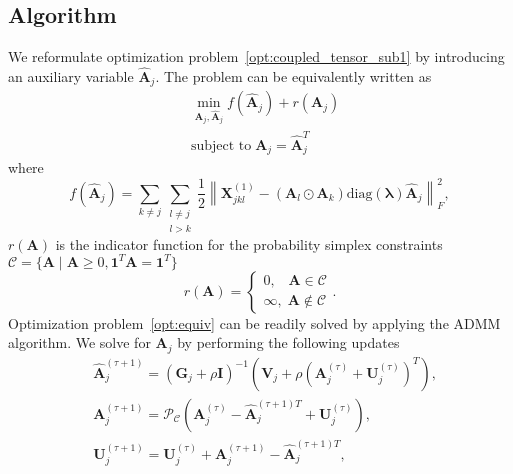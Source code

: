 \documentclass[journal]{IEEEtran}
\begin{document}
\begin{appendices}
\section{Algorithm}

\label{ap:algorithm}
We reformulate optimization problem~\eqref{opt:coupled_tensor_sub1} by introducing  an auxiliary variable $\widehat{\mathbf{A}}_j$. The problem can be equivalently written as
\begin{equation}
\begin{aligned}
&  \min_{ \mathbf{A}_j,\widehat{\mathbf{A}}_j}  f(\widehat{\mathbf{A}}_j) + r(\mathbf{A}_j) \\
& \text{subject to} \; \mathbf{A}_j = \widehat{\mathbf{A}}_j^T
\end{aligned}
\label{opt:equiv}
\end{equation}
where 
\begin{equation*} 
f(\widehat{\mathbf{A}}_j) = \sum_{k \neq j} \sum_{\substack{l\neq j \\ l > k}}  \frac{1}{2} \left \| \mathbf{X}_{jkl}^{(1)} - (\mathbf{A}_l \odot \mathbf{A}_k) \textrm{diag}(\boldsymbol{\lambda}) \widehat{\mathbf{A}}_j \right \|_F^2 ,
\end{equation*}
$r(\mathbf{A})$ is the indicator function for the probability simplex constraints $\mathcal{C} = \{ \mathbf{A}  \mid \mathbf{A}\geq 0, \mathbf{1}^T\mathbf{A} = \mathbf{1}^T\}$
\begin{equation*}
r(\mathbf{A}) = \begin{cases}
0, \;\;\;  \mathbf{A} \in \mathcal{C}\\
\infty,  \; \mathbf{A} \notin \mathcal{C}
\end{cases}.
\end{equation*}
Optimization problem~\eqref{opt:equiv} can  be readily solved by applying the ADMM algorithm.  We solve for $\mathbf{A}_j$ by performing the following updates
\begin{equation*}
\begin{aligned}
& \widehat{\mathbf{A}}_j^{(\tau + 1)} = \left( \mathbf{G}_j + \rho \mathbf{I} \right )^{-1} \left( \mathbf{V}_j  + \rho \left ( \mathbf{A}_j^{(\tau)} + \mathbf{U}_j^{(\tau)} \right )^T \right), \\
& \mathbf{A}_j^{(\tau + 1)}  =  \mathcal{P}_{\mathcal{C}}\left ( \mathbf{A}_j^{(\tau)} - \widehat{\mathbf{A}}_j^{(\tau + 1)T} + \mathbf{U}_j^{(\tau)} \right), \\
& \mathbf{U}_j^{(\tau + 1)} = \mathbf{U}_j^{(\tau)} + \mathbf{A}_j^{(\tau + 1)} - \widehat{\mathbf{A}}_j^{(\tau + 1)T}, \\

\end{aligned}
\end{equation*}
\end{appendices}
\end{document}
